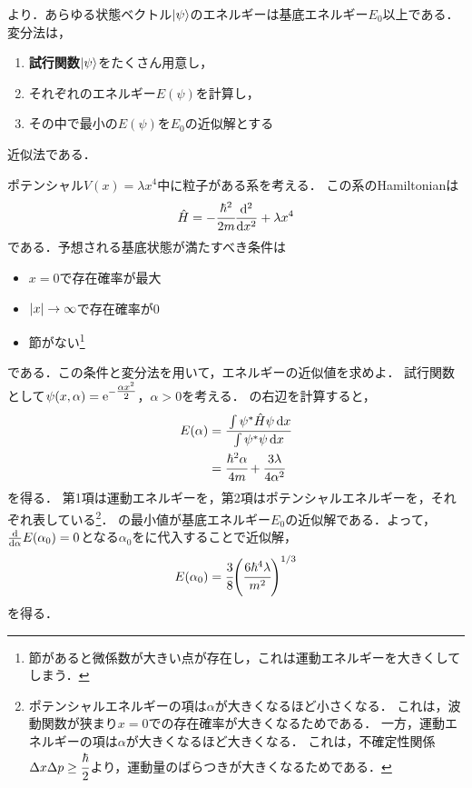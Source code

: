 \documentclass{report}
\begin{document}
  より．あらゆる状態ベクトル$\ket{\psi}$のエネルギーは基底エネルギー$E_0$以上である．
  変分法は，
  \begin{screen}
    \begin{enumerate}
      \item \textbf{試行関数}$\ket{\psi}$をたくさん用意し，
      \item それぞれのエネルギー$E(\psi)$を計算し，
      \item その中で最小の$E(\psi)$を$E_0$の近似解とする
    \end{enumerate}
  \end{screen}
  近似法である．
  \begin{myex}{}{}
    ポテンシャル$V(x)=\lambda x^4$中に粒子がある系を考える．
    この系のHamiltonianは
    \begin{align}
      \hat{H} = -\cfrac{\hbar^2}{2m}\dv[2]{x} + \lambda x^4
    \end{align}
    である．予想される基底状態が満たすべき条件は
    \begin{itemize}
      \item $x = 0$で存在確率が最大
      \item $\abs{x} \to \infty$で存在確率が0
      \item 節がない\footnote{節があると微係数が大きい点が存在し，これは運動エネルギーを大きくしてしまう．}
    \end{itemize}
    である．この条件と変分法を用いて，エネルギーの近似値を求めよ．
    \tcblower
    試行関数として$\psi(x,\alpha) = \mathrm{e}^{-\tfrac{\alpha x^2}{2}}$，$\alpha > 0$を考える．
    の右辺を計算すると，
    \begin{align}
      E(\alpha) &= \cfrac{\int \psi^{*}\hat{H}\psi \dd{x}}{\int \psi^{*}\psi \dd{x}} \label{E1} \\ 
      &= \cfrac{\hbar^2 \alpha}{4m} + \cfrac{3\lambda}{4\alpha^2}
    \end{align}
    を得る．
    第1項は運動エネルギーを，第2項はポテンシャルエネルギーを，それぞれ表している\footnote{
      ポテンシャルエネルギーの項は$\alpha$が大きくなるほど小さくなる．
      これは，波動関数が狭まり$x=0$での存在確率が大きくなるためである．
      一方，運動エネルギーの項は$\alpha$が大きくなるほど大きくなる．
      これは，不確定性関係$\Delta x\Delta p \ge \cfrac{\hbar}{2}$より，運動量のばらつきが大きくなるためである．
    }．
    の最小値が基底エネルギー$E_0$の近似解である．よって，$\dv{\alpha}E(\alpha_0) = 0$となる$\alpha_0$をに代入することで近似解，
    \begin{align}
      E(\alpha_0) = \cfrac{3}{8}\qty(\cfrac{6\hbar^4\lambda}{m^2})^{1/3}
    \end{align}
    を得る．
  \end{myex}
\end{document}
